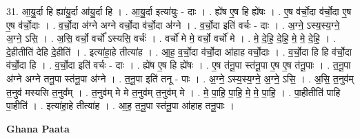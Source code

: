 \documentclass[17pt]{extarticle}
\begin{document}
31. आ॒यु॒र्दा हि ह्या॑यु॒र्दा आ॑यु॒र्दा हि । . आ॒यु॒र्दा इत्या॑युः - दाः । . ह्ये॑ष ए॒ष हि ह्ये॑षः । . ए॒ष व॑र्चो॒दा व॑र्चो॒दा ए॒ष ए॒ष व॑र्चो॒दाः । . व॒र्चो॒दा अ॑ग्ने अग्ने वर्चो॒दा व॑र्चो॒दा अ॑ग्ने । . व॒र्चो॒दा इति॑ वर्चः - दाः । . अ॒ग्ने॒ ऽस्य॒स्य॒ग्ने॒ अ॒ग्ने॒ ऽसि॒ । . अ॒सि॒ वर्चो॒ वर्चो᳚ ऽस्यसि॒ वर्चः॑ । . वर्चो॑ मे मे॒ वर्चो॒ वर्चो॑ मे । . मे॒ दे॒हि॒ दे॒हि॒ मे॒ मे॒ दे॒हि॒ । . दे॒हीतीति॑ देहि दे॒हीति॑ । . इत्या॑हा॒हे तीत्या॑ह । . आ॒ह॒ व॒र्चो॒दा व॑र्चो॒दा आ॑हाह वर्चो॒दाः । . व॒र्चो॒दा हि हि व॑र्चो॒दा व॑र्चो॒दा हि । . व॒र्चो॒दा इति॑ वर्चः - दाः । . ह्ये॑ष ए॒ष हि ह्ये॑षः । . ए॒ष त॑नू॒पा स्त॑नू॒पा ए॒ष ए॒ष त॑नू॒पाः । . त॒नू॒पा अ॑ग्ने अग्ने तनू॒पा स्त॑नू॒पा अ॑ग्ने । . त॒नू॒पा इति॑ तनू - पाः । . अ॒ग्ने॒ ऽस्य॒स्य॒ग्ने॒ अ॒ग्ने॒ ऽसि॒ । . अ॒सि॒ त॒नुव॑म् त॒नुव॑ मस्यसि त॒नुव᳚म् । . त॒नुव॑म् मे मे त॒नुव॑म् त॒नुव॑म् मे । . मे॒ पा॒हि॒ पा॒हि॒ मे॒ मे॒ पा॒हि॒ । . पा॒हीतीति॑ पाहि पा॒हीति॑ । . इत्या॑हा॒हे तीत्या॑ह । . आ॒ह॒ त॒नू॒पा स्त॑नू॒पा आ॑हाह तनू॒पाः । \newline

\textbf{Ghana Paata } \newline
\end{document}
